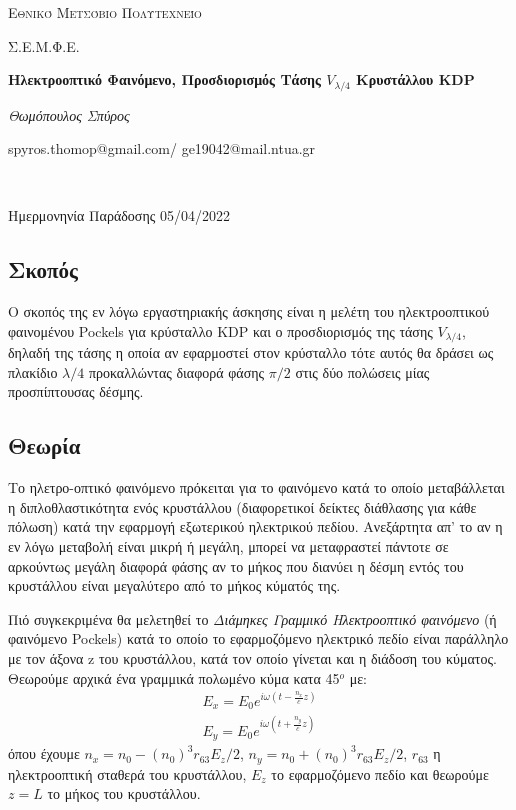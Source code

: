 \documentclass[a4paper]{article}
\begin{document}
\begin{titlepage}			%
	\centering
	{\scshape\LARGE Εθνικό Μετσόβιο Πολυτεχνείο\par}
	{\scshape \LARGE Σ.Ε.Μ.Φ.Ε.\par}
	\vspace{1cm}
	{\huge\bfseries Ηλεκτροοπτικό Φαινόμενο, Προσδιορισμός Τάσης $V_{\lambda/4}$ Κρυστάλλου KDP \par}
	\vspace{1cm}
	{\Large\itshape Θωμόπουλος Σπύρος\par}		%
	
	{\large spyros.thomop@gmail.com/ ge19042@mail.ntua.gr\par \hfill \\}%
	\vspace{1cm}
	{\large Ημερμονηνία Παράδοσης 05/04/2022\par}
\end{titlepage}

\subsection*{Σκοπός}


	Ο σκοπός της εν λόγω εργαστηριακής άσκησης είναι η μελέτη του ηλεκτροοπτικού φαινομένου Pockels για κρύσταλλο KDP και ο προσδιορισμός της τάσης $V_{\lambda/4}$, δηλαδή της τάσης η οποία αν εφαρμοστεί στον κρύσταλλο τότε αυτός θα δράσει ως πλακίδιο $\lambda/4$ προκαλλώντας διαφορά φάσης $\pi/2$ στις δύο πολώσεις μίας προσπίπτουσας δέσμης.
	
\subsection*{Θεωρία}


	Το ηλετρο-οπτικό φαινόμενο πρόκειται για το φαινόμενο κατά το οποίο μεταβάλλεται η διπλοθλαστικότητα ενός κρυστάλλου (διαφορετικοί δείκτες διάθλασης για κάθε πόλωση) κατά την εφαρμογή εξωτερικού ηλεκτρικού πεδίου. Ανεξάρτητα απ' το αν  η εν λόγω μεταβολή είναι μικρή ή μεγάλη, μπορεί να μεταφραστεί πάντοτε σε αρκούντως μεγάλη διαφορά φάσης αν το μήκος που διανύει η δέσμη εντός του κρυστάλλου είναι μεγαλύτερο από το μήκος κύματός της.

	Πιό συγκεκριμένα θα μελετηθεί το \textit{Διάμηκες Γραμμικό Ηλεκτροοπτικό φαινόμενο} (ή φαινόμενο Pockels) κατά το οποίο το εφαρμοζόμενο ηλεκτρικό πεδίο είναι παράλληλο με τον άξονα z του κρυστάλλου, κατά τον οποίο γίνεται και η διάδοση του κύματος. Θεωρούμε αρχικά ένα γραμμικά πολωμένο κύμα κατα 45$^o$ με: 
	\begin{align*}
		E_x = E_0 e^{i\omega(t - \frac{n_x}{c}z)} \\
		E_y = E_0 e^{i\omega(t + \frac{n_y}{c}z)}
	\end{align*}
	όπου έχουμε $n_x = n_0 - (n_0)^3r_{63}E_z/2$, $n_y = n_0 + (n_0)^3r_{63}E_z/2$, $r_{63}$ η ηλεκτροοπτική σταθερά του κρυστάλλου, $E_z$ το εφαρμοζόμενο πεδίο και θεωρούμε $z=L$ το μήκος του κρυστάλλου.
	
\end{document}
